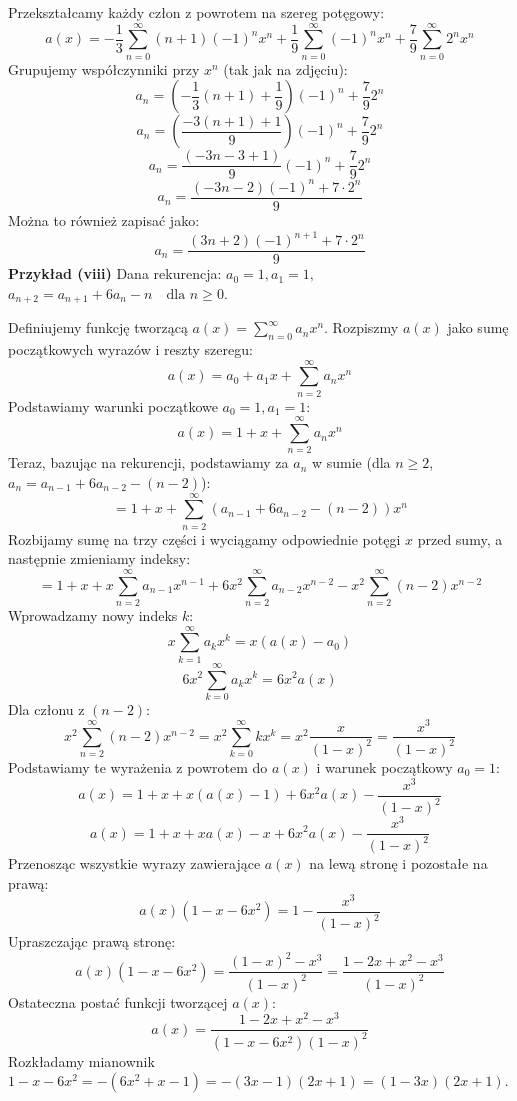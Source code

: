 \documentclass{mwart}
\begin{document}
\begin{mdframed}
    Przekształcamy każdy człon z powrotem na szereg potęgowy:
    $$ a(x) = -\frac{1}{3} \sum_{n=0}^{\infty} (n+1)(-1)^n x^n + \frac{1}{9} \sum_{n=0}^{\infty} (-1)^n x^n + \frac{7}{9} \sum_{n=0}^{\infty} 2^n x^n $$
    Grupujemy współczynniki przy $x^n$ (tak jak na zdjęciu):
    $$ a_n = \left(-\frac{1}{3}(n+1) + \frac{1}{9}\right)(-1)^n + \frac{7}{9}2^n $$
    $$ a_n = \left(\frac{-3(n+1)+1}{9}\right)(-1)^n + \frac{7}{9}2^n $$
    $$ a_n = \frac{(-3n-3+1)}{9}(-1)^n + \frac{7}{9}2^n $$
    $$ a_n = \frac{(-3n-2)(-1)^n + 7 \cdot 2^n}{9} $$
    Można to również zapisać jako:
    $$ a_n = \frac{ (3n+2)(-1)^{n+1} + 7 \cdot 2^n }{9} $$
    \textbf{Przykład (viii)}\newline
    Dana rekurencja:
    $a_0 = 1, a_1 = 1,$
    $a_{n+2} = a_{n+1} + 6a_n - n \quad \text{dla } n \ge 0.$

    Definiujemy funkcję tworzącą $a(x) = \sum_{n=0}^{\infty} a_n x^n$.
    Rozpiszmy $a(x)$ jako sumę początkowych wyrazów i reszty szeregu:
    $$ a(x) = a_0 + a_1 x + \sum_{n=2}^{\infty} a_n x^n $$
    Podstawiamy warunki początkowe $a_0 = 1, a_1 = 1$:
    $$ a(x) = 1 + x + \sum_{n=2}^{\infty} a_n x^n $$
    Teraz, bazując na rekurencji, podstawiamy za $a_n$ w sumie (dla $n \ge 2$, $a_n = a_{n-1} + 6a_{n-2} - (n-2)$):
    $$ = 1 + x + \sum_{n=2}^{\infty} (a_{n-1} + 6a_{n-2} - (n-2)) x^n $$
    Rozbijamy sumę na trzy części i wyciągamy odpowiednie potęgi $x$ przed sumy, a następnie zmieniamy indeksy:
    $$ = 1 + x + x \sum_{n=2}^{\infty} a_{n-1} x^{n-1} + 6x^2 \sum_{n=2}^{\infty} a_{n-2} x^{n-2} - x^2 \sum_{n=2}^{\infty} (n-2) x^{n-2} $$
    Wprowadzamy nowy indeks $k$:
    $$ x \sum_{k=1}^{\infty} a_k x^k = x(a(x) - a_0) $$
    $$ 6x^2 \sum_{k=0}^{\infty} a_k x^k = 6x^2 a(x) $$
    Dla członu z $(n-2)$:
    $$ x^2 \sum_{n=2}^{\infty} (n-2) x^{n-2} = x^2 \sum_{k=0}^{\infty} k x^k = x^2 \frac{x}{(1-x)^2} = \frac{x^3}{(1-x)^2} $$
    Podstawiamy te wyrażenia z powrotem do $a(x)$ i warunek początkowy $a_0=1$:
    $$ a(x) = 1 + x + x(a(x) - 1) + 6x^2 a(x) - \frac{x^3}{(1-x)^2} $$
    $$ a(x) = 1 + x + x a(x) - x + 6x^2 a(x) - \frac{x^3}{(1-x)^2} $$
    Przenosząc wszystkie wyrazy zawierające $a(x)$ na lewą stronę i pozostałe na prawą:
    $$ a(x) (1 - x - 6x^2) = 1 - \frac{x^3}{(1-x)^2} $$
    Upraszczając prawą stronę:
    $$ a(x) (1 - x - 6x^2) = \frac{(1-x)^2 - x^3}{(1-x)^2} = \frac{1 - 2x + x^2 - x^3}{(1-x)^2} $$
    Ostateczna postać funkcji tworzącej $a(x)$:
    $$ a(x) = \frac{1 - 2x + x^2 - x^3}{(1 - x - 6x^2)(1-x)^2} $$
    Rozkładamy mianownik $1 - x - 6x^2 = -(6x^2+x-1) = -(3x-1)(2x+1) = (1-3x)(2x+1)$.

\end{mdframed}
\end{document}
